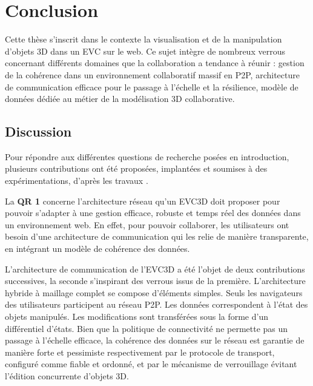 \chapter{Conclusion}
\chaptertable

Cette thèse s'inscrit dans le contexte la visualisation et de la manipulation d'objets 
3D dans un \gls{EVC} sur le web. Ce sujet intègre de nombreux verrous 
concernant différents domaines que la collaboration a tendance à réunir : gestion 
de la cohérence dans un environnement collaboratif massif en \gls{P2P}, 
architecture de communication efficace pour le passage à l'échelle et la résilience, 
modèle de données dédiée au métier de la modélisation 3D collaborative. 

\section{Discussion}
Pour répondre aux différentes questions de recherche posées en introduction, 
plusieurs contributions ont été 
proposées, implantées et soumises à des expérimentations, d'après les travaux 
\cite{Desprat2015a,Desprat2015b,Desprat2016,Desprat2017}. 


La \textbf{QR 1} concerne l'architecture réseau qu'un \gls{EVC3D} doit proposer 
pour 
pouvoir s'adapter à une gestion efficace, robuste et temps réel des données dans 
un environnement web. En effet, pour pouvoir collaborer, les utilisateurs ont besoin 
d'une architecture de communication qui les relie de manière transparente, en 
intégrant un modèle de cohérence des données. 

L'architecture de communication de l'\gls{EVC3D} a été l'objet de deux 
contributions successives, la seconde s'inspirant des verrous issus de la 
première. 
L'architecture hybride à maillage complet se compose d'éléments simples. 
Seuls les navigateurs des utilisateurs participent au réseau \gls{P2P}. Les 
données correspondent à l'état des objets manipulés. 
Les modifications sont transférées 
sous la forme d'un différentiel d'états. Bien que la politique de connectivité ne 
permette pas un passage à l'échelle efficace, la cohérence des données sur le 
réseau est garantie de manière forte et pessimiste respectivement par le protocole 
de transport, configuré comme fiable et ordonné, et par le mécanisme de 
verrouillage évitant l'édition concurrente d'objets 3D.

